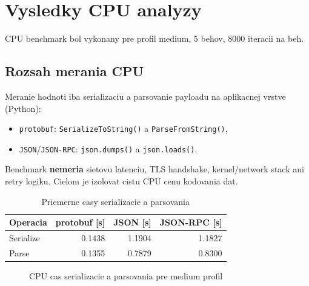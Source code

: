 \documentclass[12pt,a4paper]{report}
\begin{document}
\section{Vysledky CPU analyzy}

CPU benchmark bol vykonany pre profil medium, 5 behov, 8000 iteracii na beh.

\subsection{Rozsah merania CPU}

Meranie hodnoti iba serializaciu a parsovanie payloadu
na aplikacnej vrstve (Python):
\begin{itemize}
  \item \texttt{protobuf}: \texttt{SerializeToString()} a \texttt{ParseFromString()},
  \item \texttt{JSON}/\texttt{JSON-RPC}: \texttt{json.dumps()} a \texttt{json.loads()}.
\end{itemize}

Benchmark \textbf{nemeria} sietovu latenciu, TLS handshake, kernel/network stack
ani retry logiku. Cielom je izolovat cistu CPU cenu kodovania dat.

\begin{table}[htbp]
\centering
\caption{Priemerne casy serializacie a parsovania}
\label{tab:cpu-serialize-parse}
\begin{tabular}{|l|r|r|r|}
\hline
Operacia & protobuf [s] & JSON [s] & JSON-RPC [s] \\
\hline
Serialize & 0.1438 & 1.1904 & 1.1827 \\
Parse     & 0.1355 & 0.7879 & 0.8300 \\
\hline
\end{tabular}
\end{table}

\begin{figure}[htbp]
\centering
{}
\caption{CPU cas serializacie a parsovania pre medium profil}
\label{fig:cpu-serialize-parse}
\end{figure}
\end{document}
